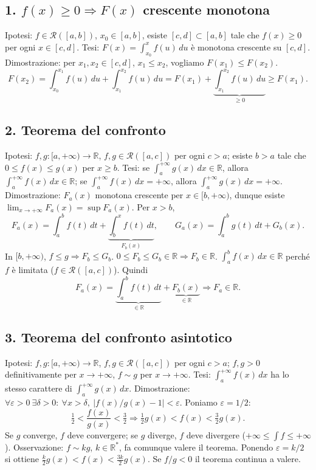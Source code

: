 \documentclass[11pt,a4paper]{article}
\newcommand{\R}{\mathbb R}\newcommand{\N}{\mathbb N}\newcommand{\pagina}[1]{\clearpage}
\begin{document}
\subsection*{1. $f(x)\ge0\Rightarrow F(x)$ crescente monotona}
Ipotesi: $f\in\mathcal R([a,b])$, $x_0\in[a,b]$, esiste $[c,d]\subset[a,b]$ tale che $f(x)\ge0$ per ogni $x\in[c,d]$.
Tesi: $F(x)=\int_{x_0}^xf(u)\,du$ è monotona crescente su $[c,d]$.
Dimostrazione: per $x_1,x_2\in[c,d]$, $x_1\le x_2$, vogliamo $F(x_1)\le F(x_2)$.
\[F(x_2)=\int_{x_0}^{x_1}f(u)\,du+\int_{x_1}^{x_2}f(u)\,du=F(x_1)+\underbrace{\int_{x_1}^{x_2}f(u)\,du}_{\ge0}\ge F(x_1).\]
\subsection*{2. Teorema del confronto}
Ipotesi: $f,g:[a,+\infty)\to\R$, $f,g\in\mathcal R([a,c])$ per ogni $c>a$; esiste $b>a$ tale che $0\le f(x)\le g(x)$ per $x\ge b$.
Tesi: se $\int_a^{+\infty}g(x)\,dx\in\R$, allora $\int_a^{+\infty}f(x)\,dx\in\R$; se $\int_a^{+\infty}f(x)\,dx=+\infty$, allora $\int_a^{+\infty}g(x)\,dx=+\infty$.
Dimostrazione: $F_a(x)$ monotona crescente per $x\in[b,+\infty)$, dunque esiste $\lim_{x\to+\infty}F_a(x)=\sup F_a(x)$.
Per $x>b$,
\[F_a(x)=\int_a^bf(t)\,dt+\underbrace{\int_b^xf(t)\,dt}_{F_b(x)},\qquad G_a(x)=\int_a^bg(t)\,dt+G_b(x).\]
\pagina{8}
In $[b,+\infty)$, $f\le g\Rightarrow F_b\le G_b$. $0\le F_b\le G_b\in\R\Rightarrow F_b\in\R$.
$\int_a^bf(x)\,dx\in\R$ perché $f$ è limitata ($f\in\mathcal R([a,c])$). Quindi
\[F_a(x)=\underbrace{\int_a^bf(t)\,dt}_{\in\R}+\underbrace{F_b(x)}_{\in\R}\Rightarrow F_a\in\R.\]
\subsection*{3. Teorema del confronto asintotico}
Ipotesi: $f,g:[a,+\infty)\to\R$, $f,g\in\mathcal R([a,c])$ per ogni $c>a$; $f,g>0$ definitivamente per $x\to+\infty$, $f\sim g$ per $x\to+\infty$.
Tesi: $\int_a^{+\infty}f(x)\,dx$ ha lo stesso carattere di $\int_a^{+\infty}g(x)\,dx$.
Dimostrazione: $\forall\varepsilon>0\ \exists\delta>0:\ \forall x>\delta,\ \left|f(x)/g(x)-1\right|<\varepsilon$.
Poniamo $\varepsilon=1/2$:
\[\tfrac12<\frac{f(x)}{g(x)}<\tfrac32\Rightarrow\tfrac12g(x)<f(x)<\tfrac32g(x).\]
Se $g$ converge, $f$ deve convergere; se $g$ diverge, $f$ deve divergere ($+\infty\le\int f\le+\infty$).
Osservazione: $f\sim kg$, $k\in\R^*$, fa comunque valere il teorema. Ponendo $\varepsilon=k/2$ si ottiene $\frac k2g(x)<f(x)<\frac{3k}2g(x)$.
\pagina{9}
Se $f/g<0$ il teorema continua a valere.
\end{document}
